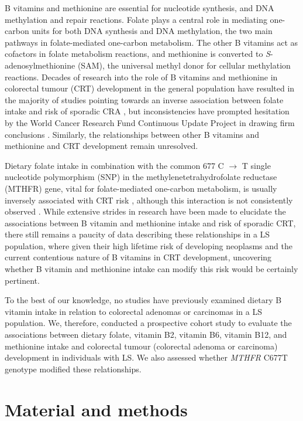 \noindent B vitamins and methionine are essential for nucleotide synthesis, and DNA methylation and repair reactions. Folate plays a central role in mediating one-carbon units for both DNA synthesis and DNA methylation, the two main pathways in folate-mediated one-carbon metabolism. The other B vitamins act as cofactors in folate metabolism reactions, and methionine is converted to \emph{S}-adenosylmethionine (SAM), the universal methyl donor for cellular methylation reactions. Decades of research into the role of B vitamins and methionine in colorectal tumour (CRT) development in the general population have resulted in the majority of studies pointing towards an inverse association between folate intake and risk of sporadic CRA \cite{c616,c617,c618}, but inconsistencies \cite{c619,c620,c621,c622} have prompted hesitation by the World Cancer Research Fund Continuous Update Project in drawing firm conclusions \cite{c623}. Similarly, the relationships between other B vitamins and methionine and CRT development remain unresolved.

\noindent Dietary folate intake in combination with the common 677 C $\rightarrow$ T single nucleotide polymorphism (SNP) in the methylenetetrahydrofolate reductase (MTHFR) gene, vital for folate-mediated one-carbon metabolism, is usually inversely associated with CRT risk \cite{c624,c625}, although this interaction is not consistently observed \cite{c621,c626,c627}. While extensive strides in research have been made to elucidate the associations between B vitamin and methionine intake and risk of sporadic CRT, there still remains a paucity of data describing these relationships in a LS population, where given their high lifetime risk of developing neoplasms and the current contentious nature of B vitamins in CRT development, uncovering whether B vitamin and methionine intake can modify this risk would be certainly pertinent.

\noindent To the best of our knowledge, no studies have previously examined dietary B vitamin intake in relation to colorectal adenomas or carcinomas in a LS population. We, therefore, conducted a prospective cohort study to evaluate the associations between dietary folate, vitamin B2, vitamin B6, vitamin B12, and methionine intake and colorectal tumour (colorectal adenoma or carcinoma) development in individuals with LS. We also assessed whether \emph{MTHFR} C677T genotype modified these relationships.

\section{Material and methods} %
